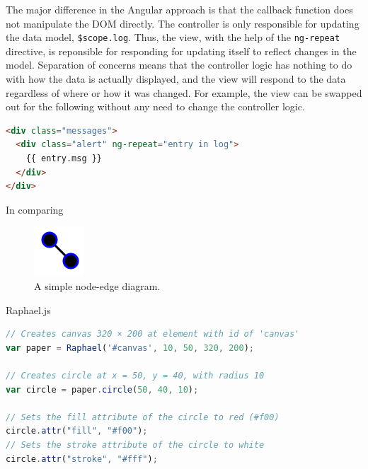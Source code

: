 The major difference in the Angular approach is that the callback function does not manipulate the DOM directly.
The controller is only responsible for updating the data model, \texttt{\$scope.log}.
Thus, the view, with the help of the \texttt{ng-repeat} directive, is reponsible for responding for updating itself to reflect changes in the model.
Separation of concerns means that the controller logic has nothing to do with how the data is actually displayed, and the view will respond to the data regardless of where or how it was changed.
For example, the view can be swapped out for the following without any need to change the controller logic.

\begin{lstlisting}[language=html]
<div class="messages">
  <div class="alert" ng-repeat="entry in log">
    {{ entry.msg }}
  </div>
</div>
\end{lstlisting}


In comparing 

\begin{figure}
  \centering
  \includegraphics[width=70px,natwidth=610,natheight=642]{images/graphene-simple-70x70.png}
  \caption{A simple node-edge diagram.}
  \label{fig:graphene-simple}
\end{figure}

Raphael.js \autocite{sencha2014raphael}

\begin{lstlisting}[language=JavaScript]
// Creates canvas 320 × 200 at element with id of 'canvas'
var paper = Raphael('#canvas', 10, 50, 320, 200);

// Creates circle at x = 50, y = 40, with radius 10
var circle = paper.circle(50, 40, 10);

// Sets the fill attribute of the circle to red (#f00)
circle.attr("fill", "#f00");
// Sets the stroke attribute of the circle to white
circle.attr("stroke", "#fff");
\end{lstlisting}




\begin{lstlisting}[language=JavaScript]

\end{lstlisting}

\begin{lstlisting}[language=html]
\end{lstlisting}





